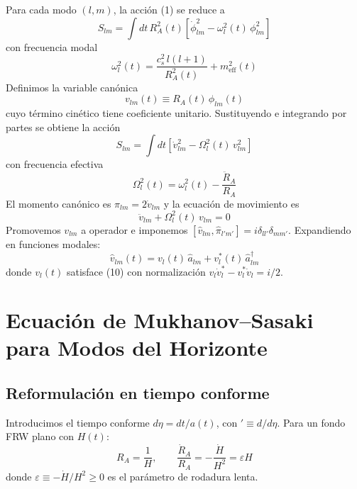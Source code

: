\documentclass[12pt,a4paper]{article}
\begin{document}
Para cada modo $(l, m)$, la acción (1) se reduce a
\begin{equation}
S_{lm} = \int dt\, R_A^2(t)\left[\dot{\phi}_{lm}^2 - \omega_l^2(t)\,\phi_{lm}^2\right] \tag{5}
\end{equation}
con frecuencia modal
\begin{equation}
\omega_l^2(t) = \frac{c_s^2\,l(l+1)}{R_A^2(t)} + m_\text{eff}^2(t) \tag{6}
\end{equation}
Definimos la variable canónica
\begin{equation}
v_{lm}(t) \equiv R_A(t)\,\phi_{lm}(t) \tag{7}
\end{equation}
cuyo término cinético tiene coeficiente unitario. Sustituyendo e integrando por partes se obtiene la acción
\begin{equation}
S_{lm} = \int dt\left[\dot{v}_{lm}^2 - \Omega_l^2(t)\,v_{lm}^2\right] \tag{8}
\end{equation}
con frecuencia efectiva
\begin{equation}
\Omega_l^2(t) = \omega_l^2(t) - \frac{\ddot{R}_A}{R_A} \tag{9}
\end{equation}
El momento canónico es $\pi_{lm} = 2\dot{v}_{lm}$ y la ecuación de movimiento es
\begin{equation}
\ddot{v}_{lm} + \Omega_l^2(t)\,v_{lm} = 0 \tag{10}
\end{equation}
Promovemos $v_{lm}$ a operador e imponemos $[\hat{v}_{lm}, \hat{\pi}_{l'm'}] = i\delta_{ll'}\delta_{mm'}$. Expandiendo en funciones modales:
\begin{equation}
\hat{v}_{lm}(t) = v_l^{\,}(t)\,\hat{a}_{lm} + v_l^*(t)\,\hat{a}_{lm}^\dagger \tag{11}
\end{equation}
donde $v_l(t)$ satisface (10) con normalización $v_l \dot{v}_l^* - v_l^* \dot{v}_l = i/2$.

\section{Ecuación de Mukhanov--Sasaki para Modos del Horizonte}

\subsection{Reformulación en tiempo conforme}

Introducimos el tiempo conforme $d\eta = dt/a(t)$, con $' \equiv d/d\eta$. Para un fondo FRW plano con $H(t)$:
\begin{equation}
R_A = \frac{1}{H}, \qquad \frac{\dot{R}_A}{R_A} = -\frac{\dot{H}}{H^2} = \varepsilon H \tag{12}
\end{equation}
donde $\varepsilon \equiv -\dot{H}/H^2 \geq 0$ es el parámetro de rodadura lenta.
\end{document}

